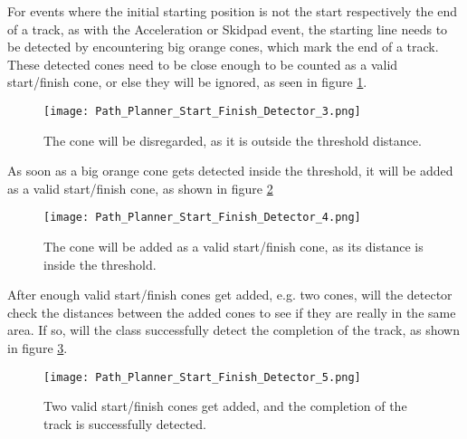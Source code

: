 For events where the initial starting position is not the start respectively the end of a track, as with the Acceleration or Skidpad event, the starting line needs to be detected by encountering big orange cones, which mark the end of a track. These detected cones need to be close enough to be counted as a valid start/finish cone, or else they will be ignored, as seen in figure \ref{fig:Path Planner Start Finish Detector 3}.
\begin{figure}[H]
    \centering
    \texttt{[image: Path\_Planner\_Start\_Finish\_Detector\_3.png]}
    \caption{The cone will be disregarded, as it is outside the threshold distance.}
    \label{fig:Path Planner Start Finish Detector 3}
\end{figure}
As soon as a big orange cone gets detected inside the threshold, it will be added as a valid start/finish cone, as shown in figure \ref{fig:Path Planner Start Finish Detector 4}
\begin{figure}[H]
    \centering
    \texttt{[image: Path\_Planner\_Start\_Finish\_Detector\_4.png]}
    \caption{The cone will be added as a valid start/finish cone, as its distance is inside the threshold.}
    \label{fig:Path Planner Start Finish Detector 4}
\end{figure}
After enough valid start/finish cones get added, e.g. two cones, will the detector check the distances between the added cones to see if they are really in the same area. If so, will the class successfully detect the completion of the track, as shown in figure \ref{fig:Path Planner Start Finish Detector 5}.
\begin{figure}[H]
    \centering
    \texttt{[image: Path\_Planner\_Start\_Finish\_Detector\_5.png]}
    \caption{Two valid start/finish cones get added, and the completion of the track is successfully detected.}
    \label{fig:Path Planner Start Finish Detector 5}
\end{figure}

